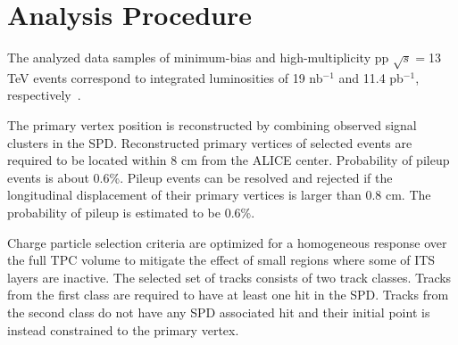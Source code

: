 \section{Analysis Procedure}
\label{sec:ana}

The analyzed data samples of minimum-bias and high-multiplicity pp $\sqrt{s}=$13 TeV events correspond to integrated luminosities of 19 nb$^{-1}$ and 11.4 pb$^{-1}$, respectively~\cite{ALICE-PUBLIC-2016-002}.

The primary vertex position is reconstructed by combining observed signal clusters in the SPD. Reconstructed primary vertices of selected events are required to be located within 8 cm from the ALICE center. Probability of pileup events is about 0.6\%. Pileup events can be resolved and rejected if the longitudinal displacement of their primary vertices is larger than 0.8 cm. The probability of pileup is estimated to be 0.6\%.

Charge particle selection criteria are optimized for a homogeneous response over the full TPC volume to mitigate the effect of small regions where some of ITS layers are inactive. The selected set of tracks consists of two track classes. Tracks from the first class are required to have at least one hit in the SPD. Tracks from the second class do not have any SPD associated hit and their initial point is instead constrained to the primary vertex.

